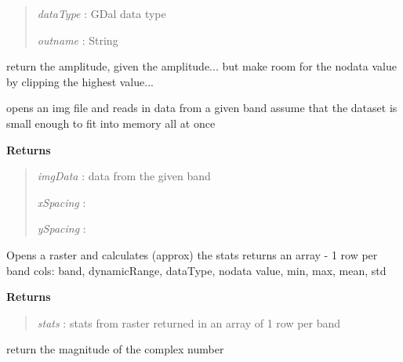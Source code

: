 \documentclass[letterpaper,10pt,english]{sphinxmanual}
\begin{document}
\begin{fulllineitems}
\begin{fulllineitems}
\begin{quote}
\emph{dataType} : GDal data type

\emph{outname}  : String
\end{quote}

\end{fulllineitems}


\begin{fulllineitems}
\label{code:Image.Image.getAmp}
return the amplitude, given the amplitude... but make room for
the nodata value by clipping the highest value...

\end{fulllineitems}


\begin{fulllineitems}
\label{code:Image.Image.getBandData}
opens an img file and reads in data from a given band
assume that the dataset is small enough to fit into memory all at once

\textbf{Returns}
\begin{quote}

\emph{imgData}  : data from the given band

\emph{xSpacing} :

\emph{ySpacing} :
\end{quote}

\end{fulllineitems}


\begin{fulllineitems}
\label{code:Image.Image.getImgStats}
Opens a raster and calculates (approx) the stats
returns an array - 1 row per band
cols: band, dynamicRange, dataType, nodata value, min, max, mean, std

\textbf{Returns}
\begin{quote}

\emph{stats} : stats from raster returned in an array of 1 row per band
\end{quote}

\end{fulllineitems}


\begin{fulllineitems}
\label{code:Image.Image.getMag}
return the magnitude of the complex number


\end{fulllineitems}
\end{fulllineitems}
\end{document}
